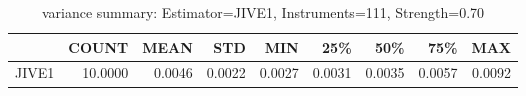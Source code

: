 \begin{table}[ht]
\centering
\caption{variance summary: Estimator=JIVE1, Instruments=111, Strength=0.70}
\begin{tabular}{lrrrrrrrr}
\toprule
 & COUNT & MEAN & STD & MIN & 25\% & 50\% & 75\% & MAX \\
\midrule
JIVE1 & 10.0000 & 0.0046 & 0.0022 & 0.0027 & 0.0031 & 0.0035 & 0.0057 & 0.0092 \\
\bottomrule
\end{tabular}
\end{table}
